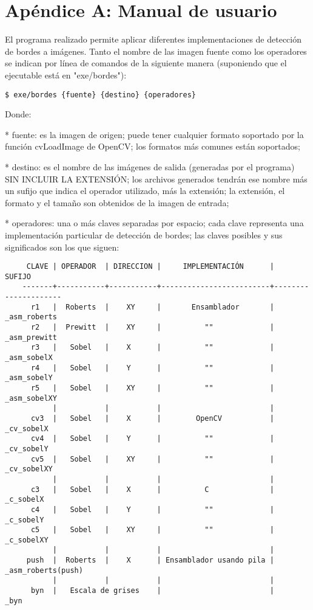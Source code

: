 \section{Apéndice A: Manual de usuario}

El programa realizado permite aplicar diferentes implementaciones de detección de bordes a imágenes. Tanto el nombre de las imagen fuente como los operadores se indican por línea de comandos de la siguiente manera (suponiendo que el ejecutable está en "exe/bordes"):


    \verb=$ exe/bordes {fuente} {destino} {operadores} =

    
Donde:

    * fuente: es la imagen de origen; puede tener cualquier formato soportado por la función cvLoadImage de OpenCV; los formatos más comunes están soportados;
    
    * destino: es el nombre de las imágenes de salida (generadas por el programa) SIN INCLUIR LA EXTENSIÓN; los archivos generados tendrán ese nombre más un sufijo que indica el operador utilizado, más la extensión; la extensión, el formato y el tamaño son obtenidos de la imagen de entrada;
    
    * operadores: una o más claves separadas por espacio; cada clave representa una implementación particular de detección de bordes; las claves posibles y sus significados son los que siguen:

\begin{verbatim}    
     CLAVE | OPERADOR  | DIRECCION |     IMPLEMENTACIÓN      |      SUFIJO
    -------+-----------+-----------+-------------------------+---------------------
      r1   |  Roberts  |    XY     |       Ensamblador       |   _asm_roberts
      r2   |  Prewitt  |    XY     |          ""             |   _asm_prewitt
      r3   |   Sobel   |    X      |          ""             |   _asm_sobelX
      r4   |   Sobel   |    Y      |          ""             |   _asm_sobelY
      r5   |   Sobel   |    XY     |          ""             |   _asm_sobelXY
           |           |           |                         |
      cv3  |   Sobel   |    X      |        OpenCV           |    _cv_sobelX
      cv4  |   Sobel   |    Y      |          ""             |    _cv_sobelY
      cv5  |   Sobel   |    XY     |          ""             |    _cv_sobelXY
           |           |           |                         |
      c3   |   Sobel   |    X      |          C              |    _c_sobelX
      c4   |   Sobel   |    Y      |          ""             |    _c_sobelY
      c5   |   Sobel   |    XY     |          ""             |    _c_sobelXY
           |           |           |                         |
     push  |  Roberts  |    X      | Ensamblador usando pila | _asm_roberts(push)
           |           |           |                         |
      byn  |   Escala de grises    |                         |      _byn
\end{verbatim}                                          


